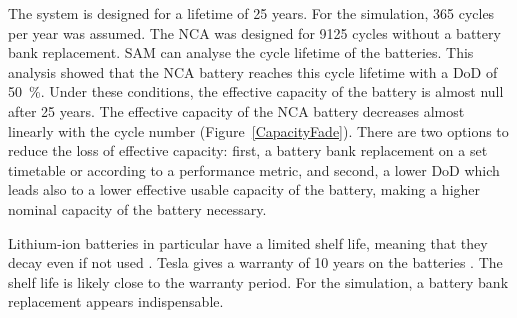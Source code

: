 The system is designed for a lifetime of 25 years. For the simulation, 365 cycles per year was assumed. The NCA was designed for \num{9125} cycles without a battery bank replacement. SAM can analyse the cycle lifetime of the batteries. This analysis showed that the NCA battery reaches this cycle lifetime with a DoD of \SI{50}{\percent}. Under these conditions, the effective capacity of the battery is almost null after 25 years. The effective capacity of the NCA battery decreases almost linearly with the cycle number (Figure~\ref{CapacityFade}). There are two options to reduce the loss of effective capacity: first, a battery bank replacement on a set timetable or according to a performance metric, and second, a lower DoD which leads also to a lower effective usable capacity of the battery, making a higher nominal capacity of the battery necessary.


Lithium-ion batteries in particular have a limited shelf life, meaning that they decay even if not used \cite{Jossen2006}. Tesla gives a warranty of 10 years on the batteries \cite{Shahan2015}. The shelf life is likely close to the warranty period. For the simulation, a battery bank replacement appears indispensable.


